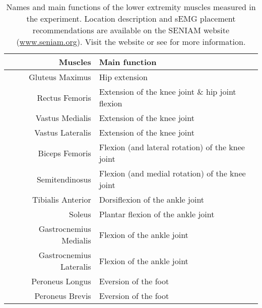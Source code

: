 \begin{table}[ht!]
    \centering
    \caption{Names and main functions of the lower extremity muscles measured in the experiment. Location description and \ac{sEMG} placement recommendations are available on the \ac{SENIAM} website (\href{www.seniam.org}{www.seniam.org}). Visit the website or see \cite{Hermens1999} for more information.}
    \label{tab:muscle-names}
    \small
    \begin{tabular}{r | l} %
        Muscles                                 & Main function \\ \hline
        Gluteus Maximus                         & Hip extension \\
        Rectus Femoris                          & Extension of the knee joint \& hip joint flexion\\
        Vastus Medialis                         & Extension of the knee joint\\
        Vastus Lateralis                        & Extension of the knee joint\\
        Biceps Femoris                          & Flexion (and lateral rotation) of the knee joint\\
        Semitendinosus                          & Flexion (and medial rotation) of the knee joint\\
        Tibialis Anterior                       & Dorsiflexion of the ankle joint \\
        Soleus                                  & Plantar flexion of the ankle joint\\
        Gastrocnemius Medialis                  & Flexion of the ankle joint\\
        Gastrocnemius Lateralis                 & Flexion of the ankle joint\\
        Peroneus Longus                         & Eversion of the foot\\
        Peroneus Brevis                         & Eversion of the foot
    \end{tabular}
\end{table}